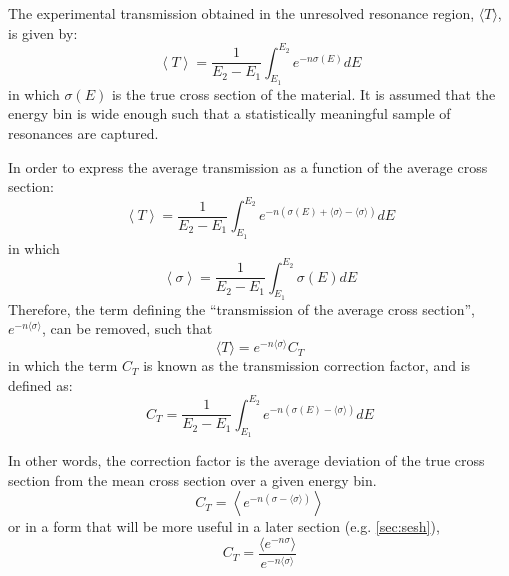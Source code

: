 The experimental transmission obtained in the unresolved resonance region, $\langle T \rangle$, is given by:
\begin{equation}
    \label{eq:transmission}
    \left\langle T \right\rangle = \frac{1}{E_2 - E_1} \int_{E_1}^{E_2} e^{-n \sigma(E)}dE
\end{equation}
in which $\sigma(E)$ is the true cross section of the material. It is assumed that the energy bin is wide enough such that a statistically meaningful sample of resonances are captured.

In order to express the average transmission as a function of the average cross section:
\begin{equation}
    \label{eq:transmission-of-average}
    \left\langle T \right\rangle = \frac{1}{E_2 - E_1} \int_{E_1}^{E_2} e^{-n \left( \sigma(E) + \langle \sigma \rangle - \langle \sigma \rangle \right)}dE
\end{equation}
in which 
\begin{equation}
    \label{eq:energy-average-cross-section}
    \left\langle \sigma \right\rangle = \frac{1}{E_2 - E_1} \int_{E_1}^{E_2} \sigma(E) dE
\end{equation}
Therefore, the term defining the ``transmission of the average cross section'', $e^{-n \langle \sigma \rangle}$, can be removed, such that 
\begin{equation}
    \label{eq:corrected-average-transmission}
    \langle T \rangle = e^{-n \langle \sigma \rangle} C_T
\end{equation}
in which the term $C_T$ is known as the transmission correction factor, and is defined as:
\begin{equation}
    \label{eq:transmission-correction-factor}
    C_T = \frac{1}{E_2 - E_1} \int_{E_1}^{E_2} e^{-n \left( \sigma(E) - \langle \sigma \rangle \right)}dE
\end{equation}

In other words, the correction factor is the average deviation of the true cross section from the mean cross section over a given energy bin.
\begin{equation}
    \label{eq:ct-elegant-form}
    C_T = \left\langle e^{-n (\sigma - \langle \sigma \rangle)} \right\rangle
\end{equation}
or in a form that will be more useful in a later section (e.g. \autoref{sec:sesh}),
\begin{equation}
    \label{eq:ct-sesh-form}
    C_T = \frac{\langle e^{-n \sigma} \rangle}{ e^{-n \langle \sigma \rangle}}
\end{equation}


